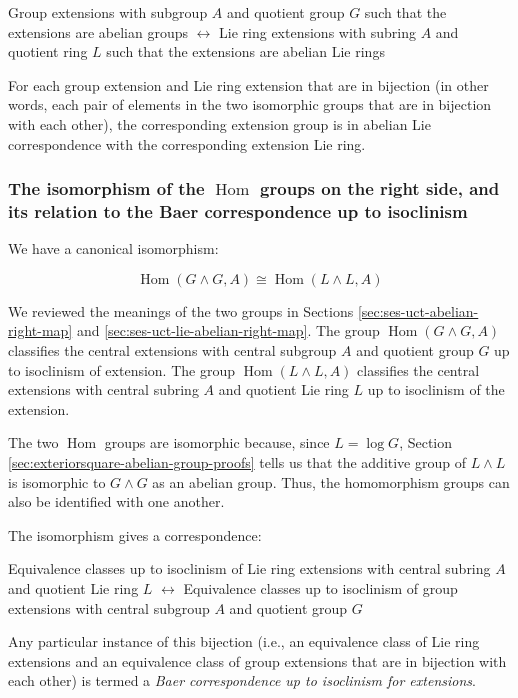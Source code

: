 \begin{center}
Group extensions with subgroup $A$ and quotient group $G$ such that
the extensions are abelian groups $\leftrightarrow$ Lie ring
extensions with subring $A$ and quotient ring $L$ such that the
extensions are abelian Lie rings
\end{center}

For each group extension and Lie ring extension that are in bijection
(in other words, each pair of elements in the two isomorphic groups
that are in bijection with each other), the corresponding extension group is in abelian
Lie correspondence with the corresponding extension Lie ring.

\subsubsection{The isomorphism of the $\operatorname{Hom}$ groups on the right side, and its relation to the Baer correspondence up to isoclinism}\label{sec:bcuti-extensions-main}

We have a canonical isomorphism:

$$\operatorname{Hom}(G \wedge G,A) \cong \operatorname{Hom}(L \wedge L, A)$$

We reviewed the meanings of the two groups in Sections
\ref{sec:ses-uct-abelian-right-map} and \ref{sec:ses-uct-lie-abelian-right-map}. The group
$\operatorname{Hom}(G \wedge G,A)$ classifies the central extensions
with central subgroup $A$ and quotient group $G$ up to isoclinism of
extension. The group $\operatorname{Hom}(L \wedge L,A)$ classifies
the central extensions with central subring $A$ and quotient Lie ring
$L$ up to isoclinism of the extension.

The two $\operatorname{Hom}$ groups are isomorphic because, since $L =
\log G$, Section \ref{sec:exteriorsquare-abelian-group-proofs} tells
us that the additive group of $L \wedge L$ is isomorphic to $G \wedge
G$ as an abelian group. Thus, the homomorphism groups can also be
identified with one another.

The isomorphism gives a correspondence:

\begin{center}
  Equivalence classes up to isoclinism of Lie ring extensions with
  central subring $A$ and quotient Lie ring $L$ $\leftrightarrow$
  Equivalence classes up to isoclinism of group extensions with central
  subgroup $A$ and quotient group $G$
\end{center}

Any particular instance of this bijection (i.e., an equivalence class
of Lie ring extensions and an equivalence class of group extensions
that are in bijection with each other) is termed a {\em Baer
  correspondence up to isoclinism for extensions}.

